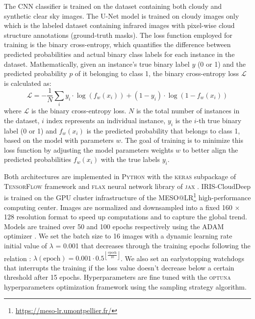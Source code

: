 \documentclass[amt, article]{copernicus}
\begin{document}
The CNN classifier is trained on the dataset containing both cloudy and synthetic clear sky images. The U-Net model is trained on cloudy images only which is the labeled dataset containing infrared images with pixel-wise cloud structure annotations (ground-truth masks). The loss function employed for training is the binary cross-entropy, which quantifies the difference between predicted probabilities and actual binary class labels for each instance in the dataset. Mathematically, given an instance's true binary label $y$ (0 or 1) and the predicted probability $p$ of it belonging to class 1, the binary cross-entropy loss $\mathcal{L}$ is calculated as:
\begin{equation}
	\mathcal{L} = -\frac{1}{N}\sum_i y_i\cdot\log\left(f_w(x_i)\right) + (1-y_i)\cdot\log\left(1-f_w(x_i)\right)
\end{equation}
where $\mathcal{L}$ is the binary cross-entropy loss. $N$ is the total number of instances in the dataset, $i$ index represents an individual instance, $y_{i}$ is the $i$-th true binary label (0 or 1) and $f_w(x_i)$ is the predicted probability that belongs to class 1, based on the model with parameters $w$. The goal of training is to minimize this loss function by adjusting the model parameters weights $w$ to better align the predicted probabilities $f_w(x_i)$ with the true labels $y_{i}$.

Both architectures are implemented in \textsc{Python} with the \textsc{keras} \citep{Keras} subpackage of \textsc{TensorFlow} framework \citep{TensorFlow} and \textsc{flax} \citep{Flax} neural network library of \textsc{jax} \citep{Jax}. IRIS-CloudDeep is trained on the GPU cluster infrastructure of the MESO@LR\footnote{\url{https://meso-lr.umontpellier.fr/}} high-performance computing center. Images are normalized and downsampled into a fixed 160 $\times$ 128 resolution format to speed up computations and to capture the global trend. Models are trained over 50 and 100 epochs respectively using the ADAM optimizer \citep{ADAM}. We set the batch size to 16 images with a dynamic learning rate initial value of $\lambda$ = 0.001 that decreases through the training epochs following the relation : $\lambda(\text{epoch}) = 0.001 \cdot 0.5^{\left\lfloor \frac{\text{epoch}}{10} \right\rfloor}
$. We also set an earlystopping watchdogs that interrupts the training if the loss value doesn't decrease below a certain threshold after 15 epochs.  Hyperparameters are fine tuned with the \textsc{optuna} hyperparameters optimization framework \citep{Optuna} using the sampling strategy algorithm.
\end{document}
